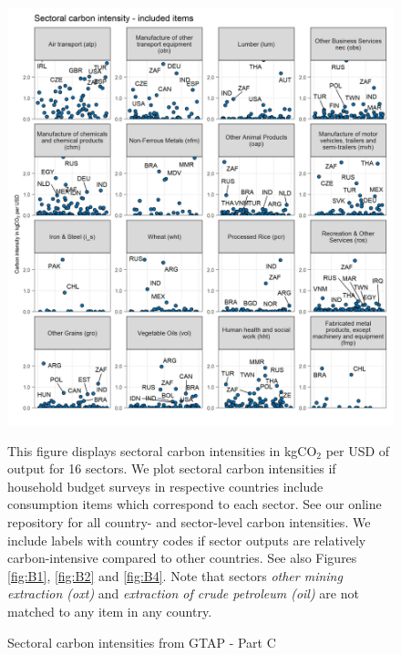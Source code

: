 \documentclass[12pt, a4paper]{article}
\newenvironment{subcaption}
{\strut
\vspace{-5pt}
\begin{minipage}[b]{0.9\textwidth}
  \hspace*{-\parindent}
  \footnotesize}
 {\end{minipage}}
\begin{document}
\begin{figure}[ht!]
  \centering
  \caption{Sectoral carbon intensities from GTAP - Part C} \label{fig:B3}
  \includegraphics{Analysis_Carbon_Intensities_GTAP/Figure_2.1.1_C_2017}
  \begin{subcaption}
    This figure displays sectoral carbon intensities in kgCO$_{2}$ per USD of output for 16 sectors. We plot sectoral carbon intensities if household budget surveys in respective countries include consumption items which correspond to each sector. See our online repository for all country- and sector-level carbon intensities. We include labels with country codes if sector outputs are relatively carbon-intensive compared to other countries. See also Figures \ref{fig:B1}, \ref{fig:B2} and \ref{fig:B4}. Note that sectors \textit{other mining extraction (oxt)} and \textit{extraction of crude petroleum (oil)} are not matched to any item in any country.
  \end{subcaption}

\end{figure}

\clearpage
\end{document}
